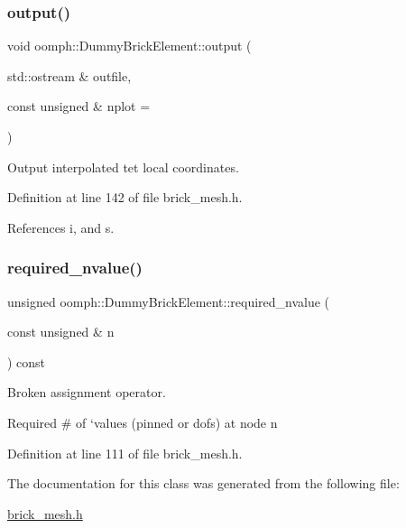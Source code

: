 \subsubsection{\texorpdfstring{output()}{output()}}
{\footnotesize\ttfamily void oomph\+::\+Dummy\+Brick\+Element\+::output (\begin{DoxyParamCaption}\item[{std\+::ostream \&}]{outfile,  }\item[{const unsigned \&}]{nplot = {} }\end{DoxyParamCaption})\hspace{0.3cm}{\ttfamily [inline]}}



Output interpolated tet local coordinates. 



Definition at line 142 of file brick\+\_\+mesh.\+h.



References i, and s.

\mbox{\label{classoomph_1_1DummyBrickElement_ab3d0bc190651749c1f1320c64a5375e0}} 
\subsubsection{\texorpdfstring{required\+\_\+nvalue()}{required\_nvalue()}}
{\footnotesize\ttfamily unsigned oomph\+::\+Dummy\+Brick\+Element\+::required\+\_\+nvalue (\begin{DoxyParamCaption}\item[{const unsigned \&}]{n }\end{DoxyParamCaption}) const\hspace{0.3cm}{\ttfamily [inline]}}



Broken assignment operator. 

Required \# of `values\textquotesingle{} (pinned or dofs) at node n 

Definition at line 111 of file brick\+\_\+mesh.\+h.



The documentation for this class was generated from the following file\+:\begin{DoxyCompactItemize}
\item 
\hyperlink{brick__mesh_8h}{brick\+\_\+mesh.\+h}\end{DoxyCompactItemize}
